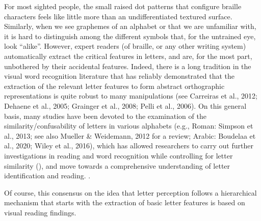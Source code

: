 \documentclass[english,man]{apa7}
\begin{document}
For most sighted people, the small raised dot patterns that configure braille characters feels like little more than an undifferentiated textured surface. Similarly, when we see graphemes of an alphabet or that we are unfamiliar with, it is hard to distinguish among the different symbols that, for the untrained eye, look \enquote{alike}. However, expert readers (of braille, or any other writing system) automatically extract the critical features in letters, and are, for the most part, unbothered by their accidental features. Indeed, there is a long tradition in the visual word recognition literature that has reliably demonstrated that the extraction of the relevant letter features to form abstract orthographic representations is quite robust to many manipulations (see Carreiras et al., 2012; Dehaene et al., 2005; Grainger et al., 2008; Pelli et al., 2006). On this general basis, many studies have been devoted to the examination of the similarity/confusability of letters in various alphabets (e.g., Roman: Simpson et al., 2013; see also Mueller \& Weidemann, 2012 for a review; Arabic: Boudelaa et al., 2020; Wiley et al., 2016), which has allowed researchers to carry out further investigations in reading and word recognition while controlling for letter similarity ({\colorbox{blue}{\sffamily\scriptsize\bfseries\color{white}{abl}}}{\sffamily\small\itshape\color{blue}{CITE: e.g., XXXX Marcet...}}), and move towards a comprehensive understanding of letter identification and reading. {\colorbox{blue}{\sffamily\scriptsize\bfseries\color{white}{abl}}}{\sffamily\small\itshape\color{blue}{Say something about expertise effects -> WILEY}}.

{\colorbox{darkyellow}{\sffamily\scriptsize\bfseries\color{white}{pga}}}{\sffamily\small\itshape\color{darkyellow}{The first sentence below is really odd beacause you never said in the paragrpah above that there is a consensus, or that the studies were about letter features.}}

Of course, this consensus on the idea that letter perception follows a hierarchical mechanism that starts with the extraction of basic letter features is based on visual reading findings.

{\colorbox{darkyellow}{\sffamily\scriptsize\bfseries\color{white}{pga}}}{\sffamily\small\itshape\color{darkyellow}{What about this?: In  visualreading research, a caonsensus has emerged regarding the extraction of features from the retinal image; in other words, we do not simply use the pattern of pixels, but instead use lines, angles, and curves as the building blocks for letter recognition.}}
\end{document}

